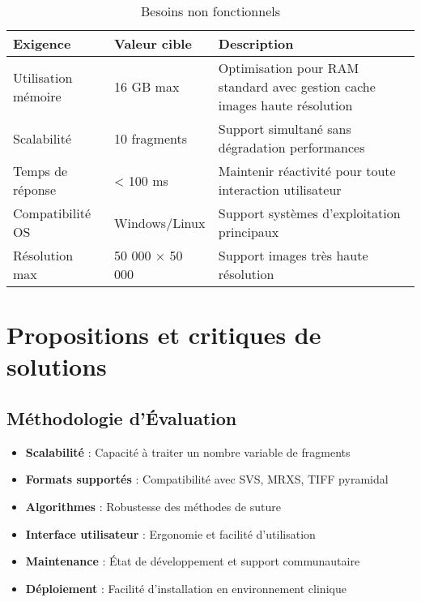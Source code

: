 \documentclass[12pt,a4paper]{report}
\begin{document}
\begin{}
\begin{}
\begin{}
\begin{}
\begin{table}[H]
\centering
\begin{tabular}{|p{4cm}|p{3cm}|p{7cm}|}
\hline
\rowcolor{TableHeaderColor}
\textbf{Exigence} & \textbf{Valeur cible} & \textbf{Description} \\
\hline
Utilisation mémoire & 16 GB max & Optimisation pour RAM standard avec gestion cache images haute résolution \\
\hline
Scalabilité & 10 fragments & Support simultané sans dégradation performances \\
\hline
Temps de réponse & < 100 ms & Maintenir réactivité pour toute interaction utilisateur \\
\hline
Compatibilité OS & Windows/Linux & Support systèmes d'exploitation principaux \\
\hline
Résolution max & 50 000 × 50 000 & Support images très haute résolution \\
\hline
\end{tabular}
\caption{Besoins non fonctionnels}
\end{table}

\section{Propositions et critiques de solutions}


\subsection{Méthodologie d'Évaluation}

\begin{tcolorbox}[colback=TechBlue!10, colframe=TechBlue, title=Critères d'Évaluation]
\begin{itemize}[leftmargin=*]
    \item \textbf{Scalabilité} : Capacité à traiter un nombre variable de fragments
    \item \textbf{Formats supportés} : Compatibilité avec SVS, MRXS, TIFF pyramidal
    \item \textbf{Algorithmes} : Robustesse des méthodes de suture
    \item \textbf{Interface utilisateur} : Ergonomie et facilité d'utilisation
    \item \textbf{Maintenance} : État de développement et support communautaire
    \item \textbf{Déploiement} : Facilité d'installation en environnement clinique
\end{itemize}
\end{tcolorbox}


\end{}
\end{}
\end{}
\end{}
\end{document}

